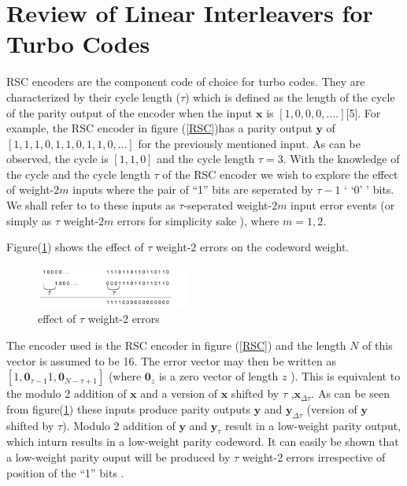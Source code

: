 \documentclass[technicalreport]{ieicej}
\begin{document}
\section{Review of Linear Interleavers for Turbo Codes}
 RSC encoders are the component code of choice for turbo codes. They are
characterized by their cycle length ($\tau$) which is defined as the length of the cycle
 of the parity output of the encoder when the input $\mathbf{x}$ is $[1,0,0,0,....]$[5]. 
For example, the RSC encoder in figure (\ref{RSC})has a parity output $\mathbf{y}$ of 
$[1,1,1,0,1,1,0,1,1,0,...]$
for the previously mentioned input. As can be observed, the cycle is $[1,1,0]$ and
the cycle length $\tau=3$. With the knowledge of the cycle and the cycle length $\tau$
of the RSC encoder we wish to explore the effect of weight-$2m$ inputs where the pair of
``1'' bits
 are seperated by $\tau-1$ ` `0' ' bits. We shall refer to to these inputs as
 $\tau$-seperated weight-$2m$ input error events (or simply as $\tau$ weight-$2m$ errors for
 simplicity sake ), where $m={1,2}$. 

 Figure(\ref{RSC3})  shows the effect of $\tau$ weight-2 errors on the codeword weight.
 
\begin{figure}[h!]
\centering
		\includegraphics[width=0.45\textwidth]{RSCExample.pdf}
		\caption{ effect of $\tau$ weight-2 errors}
		\label{RSC3}
		\end{figure}
	
 The encoder used is the RSC encoder in figure (\ref{RSC})
  and the length $N$ of this vector is assumed to 
be 16. The error vector may then be written as $[1, \mathbf{0}_{\tau-1} 1, \mathbf{0}_{N-\tau+1}]$
(where $\mathbf{0}_z$ is a zero vector of length $z$ ).
This is equivalent to the modulo 2 addition of $\mathbf{x}$ and a version of
 $\mathbf{x}$ shifted by $\tau$ ,$\mathbf{x}_{\Delta\tau}$. As can be seen from 
figure(\ref{RSC3}) these inputs produce parity outputs $\mathbf{y}$ and $\mathbf{y}_{\Delta \tau}$
(version of $\mathbf{y}$ shifted by $\tau$). Modulo 2 addition of $\mathbf{y}$ and
$\mathbf{y}_{\tau}$ result in a low-weight parity output, which inturn results
in a low-weight parity codeword. It can easily be shown that a low-weight parity ouput
will be produced by $\tau$ weight-2 errors irrespective of position of the ``1'' bits . 
\end{document}
